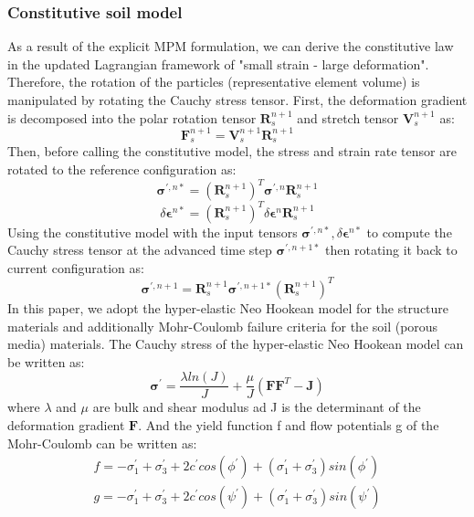 \documentclass[preprint,12pt]{elsarticle}
\begin{document}
\subsubsection{Constitutive soil model}
As a result of the explicit MPM formulation, we can derive the constitutive law in the updated Lagrangian framework of "small strain - large deformation". Therefore, the rotation of the particles (representative element volume) is manipulated by rotating the Cauchy stress tensor. First, the deformation gradient is decomposed into the polar rotation tensor $\pmb{R}_s^{n+1}$ and stretch tensor $\pmb{V}_s^{n+1}$ as:
%
%
\begin{equation}
     \pmb{F}_s^{n+1} = \pmb{V}_s^{n+1} \pmb{R}_s^{n+1}
\end {equation}
%
%
Then, before calling the constitutive model, the stress and strain rate tensor are rotated to the reference configuration as:
%
%
\begin{equation}
     \pmb{\sigma}^{\prime,n*} =  (\pmb{R}_s^{n+1})^T \pmb{\sigma}^{\prime,n} \pmb{R}_s^{n+1}
\end {equation}
%
%
\begin{equation}
    \delta \pmb{\epsilon}^{n*} =  (\pmb{R}_s^{n+1})^T \delta \pmb{\epsilon}^{n} \pmb{R}_s^{n+1}
\end {equation}
%
%
Using the constitutive model with the input tensors $\pmb{\sigma}^{\prime,n*}, \delta \pmb{\epsilon}^{n*}$ to compute the Cauchy stress tensor at the advanced time step $\pmb{\sigma}^{\prime,n+1*}$ then rotating it back to current configuration as:
%
%
\begin{equation}
    \pmb{\sigma}^{\prime,n+1} =  \pmb{R}_s^{n+1} \pmb{\sigma}^{\prime,n+1*} (\pmb{R}_s^{n+1})^T
\end {equation}
%
%
In this paper, we adopt the hyper-elastic Neo Hookean model for the structure materials and additionally Mohr-Coulomb failure criteria for the soil (porous media) materials. The Cauchy stress of the hyper-elastic Neo Hookean model can be written as:
%
%
\begin{equation}
    \pmb{\sigma}^{\prime} =  \frac{ \lambda ln(J)}{J} + \frac{\mu}{J} (\pmb{F} \pmb{F}^T - \pmb{J})
\end {equation}
%
%
where $\lambda$ and $\mu$ are bulk and shear modulus ad J is the determinant of the deformation gradient $\pmb{F}$. And the yield function f and flow potentials g of the Mohr-Coulomb can be written as:
%
%
\begin{equation}
\begin{gathered}
   f =  -\sigma_1^{\prime} +  \sigma_3^{\prime} +2c^{\prime} cos(\phi^{\prime}) + (\sigma_1^{\prime} +  \sigma_3^{\prime})sin(\phi^{\prime})\\
   g =  -\sigma_1^{\prime} +  \sigma_3^{\prime} +2c^{\prime} cos(\psi^{\prime}) + (\sigma_1^{\prime} +  \sigma_3^{\prime})sin(\psi^{\prime})
\end {gathered}
\end {equation}
\end{document}
